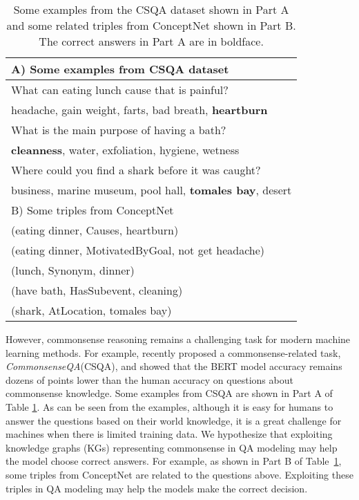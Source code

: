 \documentclass[11pt,a4paper]{article}
\begin{document}
\begin{table}[t]
	\small
	\begin{center}
		\begin{tabular}{p{7.3cm}}
			\toprule
			A) Some examples from CSQA dataset \\
			\midrule
			What can eating lunch cause that is painful? \\
			headache, gain weight, farts, bad breath, \textbf{heartburn} \\
			\midrule
			What is the main purpose of having a bath? \\
			\textbf{cleanness}, water, exfoliation, hygiene, wetness \\
			\midrule
			Where could you find a shark before it was caught? \\
            business, marine museum, pool hall, \textbf{tomales bay}, desert \\
			\bottomrule
			\toprule
			B) Some triples from ConceptNet \\
			\midrule
			(eating dinner, Causes, heartburn) \\
			(eating dinner, MotivatedByGoal, not get headache) \\
			(lunch, Synonym, dinner) \\
			\midrule
			(have bath, HasSubevent, cleaning) \\
			\midrule
			(shark, AtLocation, tomales bay) \\
			\bottomrule
		\end{tabular}
	\end{center}
	\caption{Some examples from the CSQA dataset shown in Part A and some related triples from ConceptNet shown in Part B. The correct answers in Part A are in boldface.}
	\label{tab:example}
\end{table}


However, commonsense reasoning remains a challenging task for modern machine learning methods. 
For example, recently \citet{talmor-etal-2019-commonsenseqa} proposed a commonsense-related task, \textit{CommonsenseQA}(CSQA), and showed that the BERT model accuracy remains dozens of points lower than the human accuracy on questions about commonsense knowledge.
Some examples from CSQA are shown in Part A of Table \ref{tab:example}. As can be seen from the examples, although it is easy for humans to answer the questions based on their world knowledge, it is a great challenge for machines when there is limited training data. We hypothesize that exploiting knowledge graphs (KGs) representing commonsense in QA modeling may help the model choose correct answers. For example, as shown in Part B of Table~\ref{tab:example}, some triples from ConceptNet \citep{speer2017conceptnet} are related to the questions above. Exploiting these triples in QA modeling may help the models make the correct decision.
\end{document}
